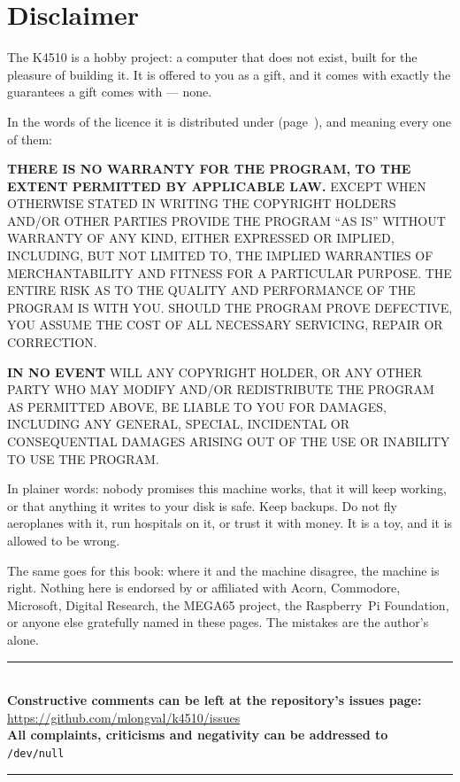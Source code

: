 \chapter{Disclaimer}\label{cha:disclaimer}

The K4510 is a hobby project: a computer that does not exist,
built for the pleasure of building it. It is offered to you as a gift,
and it comes with exactly the guarantees a gift comes with --- none.

In the words of the licence it is distributed under
(page~\pageref{cha:licences}), and meaning every one of them:

\begin{aside}
\footnotesize
\textbf{THERE IS NO WARRANTY FOR THE PROGRAM, TO THE EXTENT PERMITTED
BY APPLICABLE LAW.} EXCEPT WHEN OTHERWISE STATED IN WRITING THE
COPYRIGHT HOLDERS AND/OR OTHER PARTIES PROVIDE THE PROGRAM ``AS IS''
WITHOUT WARRANTY OF ANY KIND, EITHER EXPRESSED OR IMPLIED, INCLUDING,
BUT NOT LIMITED TO, THE IMPLIED WARRANTIES OF MERCHANTABILITY AND
FITNESS FOR A PARTICULAR PURPOSE. THE ENTIRE RISK AS TO THE QUALITY
AND PERFORMANCE OF THE PROGRAM IS WITH YOU. SHOULD THE PROGRAM PROVE
DEFECTIVE, YOU ASSUME THE COST OF ALL NECESSARY SERVICING, REPAIR OR
CORRECTION.

\textbf{IN NO EVENT} WILL ANY COPYRIGHT HOLDER, OR ANY OTHER PARTY WHO
MAY MODIFY AND/OR REDISTRIBUTE THE PROGRAM AS PERMITTED ABOVE, BE
LIABLE TO YOU FOR DAMAGES, INCLUDING ANY GENERAL, SPECIAL, INCIDENTAL
OR CONSEQUENTIAL DAMAGES ARISING OUT OF THE USE OR INABILITY TO USE
THE PROGRAM.
\end{aside}

In plainer words: nobody promises this machine works, that it will
keep working, or that anything it writes to your disk is safe. Keep
backups. Do not fly aeroplanes with it, run hospitals on it, or trust
it with money. It is a toy, and it is allowed to be wrong.

The same goes for this book: where it and the machine disagree, the
machine is right. Nothing here is endorsed by or affiliated with
Acorn, Commodore, Microsoft, Digital Research, the MEGA65 project, the
Raspberry~Pi Foundation, or anyone else gratefully named in these
pages. The mistakes are the author's alone.

\newpage
\vspace*{4cm}
\begin{center}
{\color{korange}\rule{0.5\linewidth}{0.8pt}}\\[6mm]
\textbf{Constructive comments can be left at the repository's issues
page:}\\
\url{https://github.com/mlongval/k4510/issues}\\[4mm]
\textbf{All complaints, criticisms and negativity can be addressed
to}\\
\texttt{/dev/null}\\[6mm]
{\color{korange}\rule{0.5\linewidth}{0.8pt}}
\end{center}
